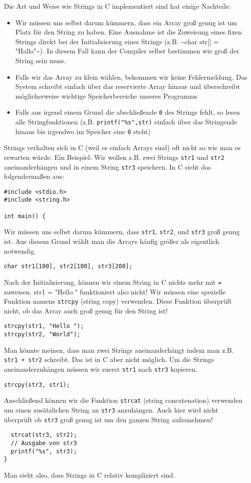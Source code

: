 \documentclass[11pt]{article}
\begin{document}
Die Art und Weise wie Strings in C implementiert sind hat einige Nachteile:
\begin{itemize}
\item Wir müssen uns selbst darum kümmern, dass ein Array groß genug ist
um Platz für den String zu haben. Eine Ausnahme ist die Zuweisung
eines fixen Strings direkt bei der Initialisierung eines Strings
(z.B. \textasciitilde{}char str[] = "Hallo"\textasciitilde{}). In diesem Fall kann der Compiler
selbst bestimmen wie groß der String sein muss.
\item Falls wir das Array zu klein wählen, bekommen wir keine
Fehlermeldung. Das System schreibt einfach über das reservierte
Array hinaus und überschreibt möglicherweise wichtige
Speicherbereiche unseres Programms
\item Falls aus irgend einem Grund die abschließende \verb~0~ des Strings
fehlt, so lesen alle Stringfunktionen (z.B. \verb~printf("%s",str)~
einfach über das Stringende hinaus bis irgendwo im Speicher eine \verb~0~
steht)
\end{itemize}
Strings verhalten sich in C (weil es einfach Arrays sind) oft nicht so
wie man es erwarten würde. Ein Beispiel: Wir wollen z.B. zwei Strings
\verb~str1~ und \verb~str2~ aneinanderhängen und in einem String \verb~str3~
speichern. In C sieht das folgendermaßen aus:
\begin{verbatim}
#include <stdio.h>
#include <string.h>

int main() {
\end{verbatim}
Wir müssen uns selbst darum kümmern, dass \verb~str1~, \verb~str2~, und \verb~str3~
groß genug ist. Aus diesem Grund wählt man die Arrays häufig größer
als eigentlich notwendig.
\begin{verbatim}
char str1[100], str2[100], str3[200];
\end{verbatim}
Nach der Initialisierung, können wir einem String in C nichts mehr mit
\verb~=~ zuweisen. str1 = "Hello " funktioniert also nicht! Wir müssen eine
spezielle Funktion namens \verb~strcpy~ (string copy) verwenden. Diese
Funktion überprüft nicht, ob das Array auch groß genug für den String
ist!
\begin{verbatim}
strcpy(str1, "Hello ");
strcpy(str2, "World");
\end{verbatim}
Man könnte meinen, dass man zwei Strings aneinanderhängt indem man
z.B. \verb~str1 + str2~ schreibt. Das ist in C aber nicht möglich. Um die
Strings aneinanderzuhängen müssen wir zuerst \verb~str1~ nach \verb~str3~
kopieren.
\begin{verbatim}
strcpy(str3, str1);
\end{verbatim}
Anschließend können wir die Funktion \verb~strcat~ (string concatenation)
verwenden um einen zusätzlichen String an \verb~str3~ anzuhängen. Auch hier
wird nicht überprüft ob \verb~str3~ groß genug ist um den ganzen String
aufzunehmen!
\begin{verbatim}
  strcat(str3, str2);
  // Ausgabe von str3
  printf("%s", str3);
}
\end{verbatim}
Man sieht also, dass Strings in C relativ kompliziert sind.
\end{document}
